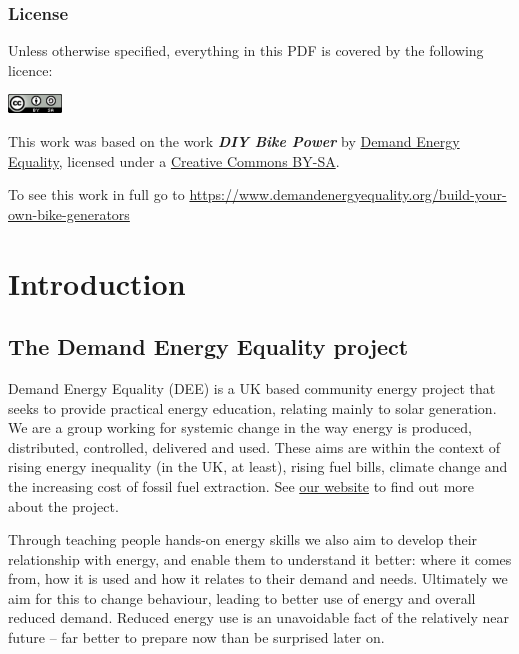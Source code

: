 \documentclass{article}
\theoremstyle{definition}
\theoremstyle{definition}
\theoremstyle{remark}
\begin{document}
  \subsubsection*{License} %
  \label{ssub:license}

    Unless otherwise specified, everything in this PDF is covered by the following licence:

    \includegraphics[]{../Images/image_0_2_(license).png} \newline

    This work was based on the work \textbf{\textit{DIY Bike Power}} by \href{https://www.demandenergyequality.org/}{Demand Energy Equality}, licensed under a \href{https://creativecommons.org/licenses/by-sa/4.0/legalcode}{Creative Commons BY-SA}.

    To see this work in full go to \href{https://www.demandenergyequality.org/build-your-own-bike-generators}{https://www.demandenergyequality.org/build-your-own-bike-generators}
  


\newpage

\section{Introduction} %
\label{sec:introduction}

  \subsection{The Demand Energy Equality project} %
  \label{sub:the_demand_energy_equality_project}

    Demand Energy Equality (DEE) is a UK based community energy project that seeks to provide practical energy education, relating mainly to solar generation. We are a group working for systemic change in the way energy is produced, distributed, controlled, delivered and used. These aims are within the context of rising energy inequality (in the UK, at least), rising fuel bills, climate change and the increasing cost of fossil fuel extraction. See \href{https://www.demandenergyequality.org/about/}{our website} to find out more about the project.

    Through teaching people hands-on energy skills we also aim to develop their relationship with energy, and enable them to understand it better: where it comes from, how it is used and how it relates to their demand and needs. Ultimately we aim for this to change behaviour, leading to better use of energy and overall reduced demand. Reduced energy use is an unavoidable fact of the relatively near future – far better to prepare now than be surprised later on.
\end{document}
